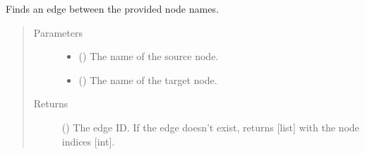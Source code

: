 \documentclass[letterpaper,10pt,english]{sphinxmanual}
\begin{document}
\begin{fulllineitems}

\begin{fulllineitems}
\label{\detokenize{main:pypath.main.PyPath.sources_hist}}
\end{fulllineitems}


\begin{fulllineitems}
\label{\detokenize{main:pypath.main.PyPath.sources_overlap}}
\end{fulllineitems}


\begin{fulllineitems}
\label{\detokenize{main:pypath.main.PyPath.sources_venn_data}}
\end{fulllineitems}


\begin{fulllineitems}
\label{\detokenize{main:pypath.main.PyPath.straight_between}}
Finds an edge between the provided node names.
\begin{quote}\begin{description}
\item[{Parameters}] \leavevmode\begin{itemize}
\item {} 
 () \textendash{} The name of the source node.

\item {} 
 () \textendash{} The name of the target node.

\end{itemize}

\item[{Returns}] \leavevmode
() \textendash{} The edge ID. If the edge doesn’t exist, returns
{[}list{]} with the node indices {[}int{]}.


\end{description}
\end{quote}
\end{fulllineitems}
\end{fulllineitems}
\end{document}
